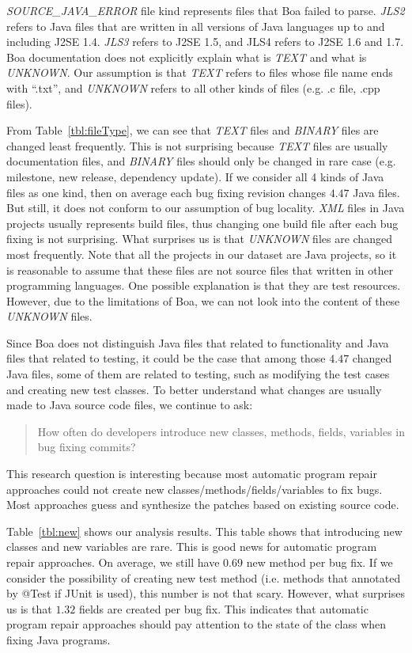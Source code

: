\documentclass{sig-alternate-05-2015}
\begin{document}
\emph{SOURCE\_JAVA\_ERROR} file kind represents files that Boa failed to parse.
\emph{JLS2} refers to Java files that are written in all versions of Java
languages up to and including J2SE 1.4. \emph{JLS3} refers to J2SE 1.5, and JLS4
refers to J2SE 1.6 and 1.7. Boa documentation does not explicitly explain what
is \emph{TEXT} and what is \emph{UNKNOWN}. Our assumption is that \emph{TEXT}
refers to files whose file name ends with ``.txt'', and \emph{UNKNOWN} refers to
all other kinds of files (e.g. .c file, .cpp files).

From Table~\ref{tbl:fileType}, we can see that \emph{TEXT} files and
\emph{BINARY} files are changed least frequently. This is not surprising because
\emph{TEXT} files are usually documentation files, and \emph{BINARY} files
should only be changed in rare case (e.g.  milestone, new release, dependency
update). If we consider all 4 kinds of Java files as one kind, then on average
each bug fixing revision changes $4.47$ Java files. But still, it does not
conform to our assumption of bug locality. \emph{XML} files in Java projects
usually represents build files, thus changing one build file after each bug
fixing is not surprising.  What surprises us is that \emph{UNKNOWN} files are
changed most frequently. Note that all the projects in our dataset are Java
projects, so it is reasonable to assume that these files are not source files
that written in other programming languages.  One possible explanation is that
they are test resources. However, due to the limitations of Boa, we can not look
into the content of these \emph{UNKNOWN} files. 

Since Boa does not distinguish Java files that related to functionality and Java
files that related to testing, it could be the case that among those $4.47$
changed Java files, some of them are related to testing, such as modifying the
test cases and creating new test classes. To better understand what changes are
usually made to Java source code files, we continue to ask:

\begin{quote}
	How often do developers introduce new classes, methods, fields, variables in
	bug fixing commits?
\end{quote}

This research question is interesting because most automatic program repair
approaches could not create new classes/methods/fields/variables to fix bugs.
Most approaches guess and synthesize the patches based on existing source code.

Table~\ref{tbl:new} shows our analysis results. This table shows that
introducing new classes and new variables are rare. This is good news for
automatic program repair approaches. On average, we still have $0.69$ new method
per bug fix. If we consider the possibility of creating new test method (i.e.
methods that annotated by @Test if JUnit is used), this number is not that
scary. However, what surprises us is that $1.32$ fields are created per bug fix.
This indicates that automatic program repair approaches should pay attention to
the state of the class when fixing Java programs.
\end{document}
